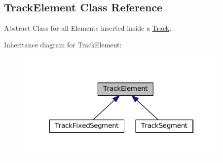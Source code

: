 \hypertarget{classKite_1_1TrackElement}{}\subsection{Track\+Element Class Reference}
\label{classKite_1_1TrackElement}


Abstract Class for all Elements inserted inside a \mbox{\hyperlink{classKite_1_1Track}{Track}}.  




Inheritance diagram for Track\+Element\+:\nopagebreak
\begin{figure}[H]
\begin{center}
\leavevmode
\includegraphics[width=297pt]{classKite_1_1TrackElement__inherit__graph}
\end{center}
\end{figure}
